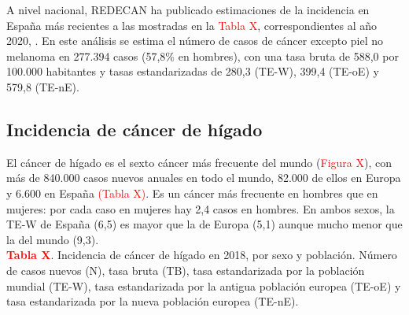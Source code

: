 A nivel nacional, REDECAN ha publicado estimaciones de la incidencia en España más recientes a las mostradas en la \textcolor{red}{Tabla X}, correspondientes al año 2020, \cite{REDECAN2020}. En este análisis se estima el número de casos de cáncer excepto piel no melanoma en 277.394 casos (57,8\% en hombres), con una tasa bruta de 588,0 por 100.000 habitantes y tasas estandarizadas de 280,3 (TE-W), 399,4 (TE-oE) y 579,8 (TE-nE).

\subsection{Incidencia de cáncer de hígado}

El cáncer de hígado es el sexto cáncer más frecuente del mundo (\textcolor{red}{Figura X}), con más de 840.000 casos nuevos anuales en todo el mundo, 82.000 de ellos en Europa y 6.600 en España \textcolor{red}{(Tabla X)}. Es un cáncer más frecuente en hombres que en mujeres: por cada caso en mujeres hay 2,4 casos en hombres. En ambos sexos, la TE-W de España (6,5) es mayor que la de Europa (5,1) aunque mucho menor que la del mundo (9,3).\\

\newpage
\textbf{\textcolor{red}{Tabla X}}. Incidencia de cáncer de hígado en 2018, por sexo y población. Número de casos nuevos (N), tasa bruta (TB), tasa estandarizada por la población mundial (TE-W),  tasa estandarizada por la antigua población europea (TE-oE) y  tasa estandarizada por la nueva población europea (TE-nE).

